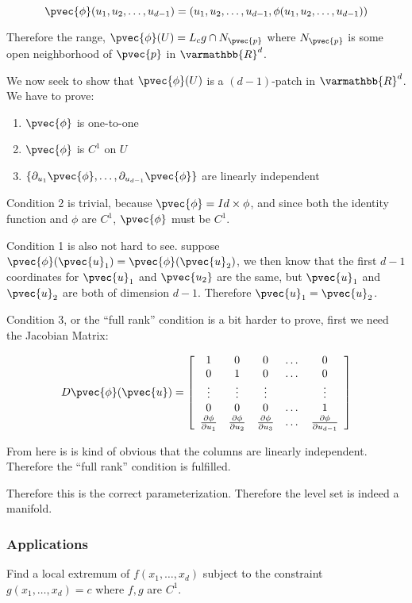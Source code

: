 \documentclass[11 pt, twoside]{article}
\begin{document}
\[
\pvec{\phi}(u_1, u_2, \dots, u_{d-1}) = (u_1, u_2, \dots, u_{d - 1}, \phi(u_1,
u_2, \dots, u_{d - 1}))
\]

Therefore the range, $\pvec{\phi}(U) = L_c g \cap N_{\pvec{p}}$ where
$N_{\pvec{p}}$ is some open neighborhood of $\pvec{p}$ in $\varmathbb{R}^d$.

We now seek to show that $\pvec{\phi}(U)$ is a $(d-1)$-patch in
$\varmathbb{R}^d$. We have to prove:
\begin{enumerate}
\item $\pvec{\phi}$ is one-to-one
\item $\pvec{\phi}$ is $C^1$ on $U$
\item $\{\partial_{u_1} \pvec{\phi}, \dots, \partial_{u_{d - 1}}
\pvec{\phi}\}$ are linearly independent
\end{enumerate}

Condition 2 is trivial, because $\pvec{\phi} = Id \times \phi$, and since both
the identity function and $\phi$ are $C^1$, $\pvec{\phi}$ must be $C^1$.

Condition 1 is also not hard to see. suppose $\pvec{\phi}(\pvec{u}_1) =
\pvec{\phi}(\pvec{u}_2)$, we then know that the first $d-1$ coordinates for
$\pvec{u}_1$ and $\pvec{u_2}$ are the same, but $\pvec{u}_1$ and $\pvec{u}_2$ are
both of dimension $d - 1$. Therefore $\pvec{u}_1 = \pvec{u}_2$.

Condition 3, or the ``full rank'' condition is a bit harder to prove, first we
need the Jacobian Matrix:

\[
D\pvec{\phi}(\pvec{u}) =
\left[\begin{array}{ccccc}
1 & 0 & 0 & \dots & 0 \\
0 & 1 & 0 & \dots & 0 \\
\vdots & \vdots & \vdots & & \vdots\\
0 & 0 & 0 & \dots & 1 \\
\frac{\partial \phi}{\partial u_1} & \frac{\partial \phi}{\partial u_2}
& \frac{\partial \phi}{\partial u_3} & \dots &
\frac{\partial \phi}{\partial u_{d - 1}}
\end{array}\right]
\]

From here is is kind of obvious that the columns are linearly independent.
Therefore the ``full rank'' condition is fulfilled.

Therefore this is the correct parameterization. Therefore the level set is indeed a manifold.

\subsubsection{Applications}
Find a local extremum of $f(x_1, \dots, x_d)$ subject to the constraint $g(x_1,
\dots, x_d) = c$ where $f, g$ are $C^1$.
\end{document}
